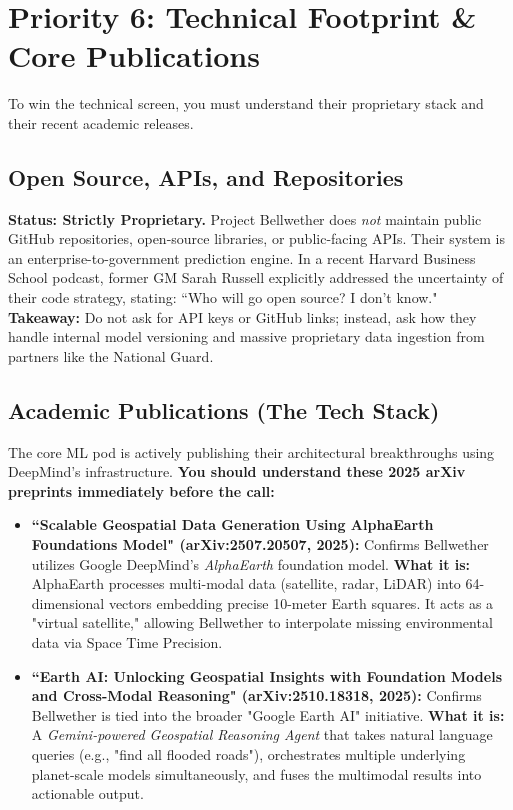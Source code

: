\documentclass[11pt]{article}
\begin{document}
\section{Priority 6: Technical Footprint \& Core Publications}
To win the technical screen, you must understand their proprietary stack and their recent academic releases.

\subsection*{Open Source, APIs, and Repositories}
\textbf{Status: Strictly Proprietary.} Project Bellwether does \textit{not} maintain public GitHub repositories, open-source libraries, or public-facing APIs. Their system is an enterprise-to-government prediction engine. In a recent Harvard Business School podcast, former GM Sarah Russell explicitly addressed the uncertainty of their code strategy, stating: ``Who will go open source? I don't know." \textbf{Takeaway:} Do not ask for API keys or GitHub links; instead, ask how they handle internal model versioning and massive proprietary data ingestion from partners like the National Guard.

\subsection*{Academic Publications (The Tech Stack)}
The core ML pod is actively publishing their architectural breakthroughs using DeepMind's infrastructure. \textbf{You should understand these 2025 arXiv preprints immediately before the call:}
\begin{itemize}[leftmargin=*]
    \item \textbf{``Scalable Geospatial Data Generation Using AlphaEarth Foundations Model" (arXiv:2507.20507, 2025):} Confirms Bellwether utilizes Google DeepMind's \textit{AlphaEarth} foundation model. \textbf{What it is:} AlphaEarth processes multi-modal data (satellite, radar, LiDAR) into 64-dimensional vectors embedding precise 10-meter Earth squares. It acts as a "virtual satellite," allowing Bellwether to interpolate missing environmental data via Space Time Precision.
    \item \textbf{``Earth AI: Unlocking Geospatial Insights with Foundation Models and Cross-Modal Reasoning" (arXiv:2510.18318, 2025):} Confirms Bellwether is tied into the broader "Google Earth AI" initiative. \textbf{What it is:} A \textit{Gemini-powered Geospatial Reasoning Agent} that takes natural language queries (e.g., "find all flooded roads"), orchestrates multiple underlying planet-scale models simultaneously, and fuses the multimodal results into actionable output.
\end{itemize}
\end{document}
